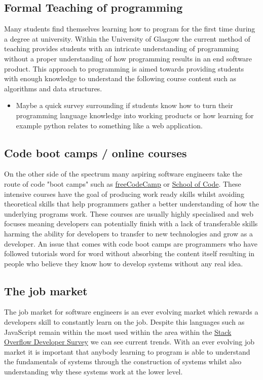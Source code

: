 \documentclass{l4proj}
\begin{document}
\subsection{Formal Teaching of programming}
Many students find themselves learning how to program for the first time during a degree at university. Within the University of Glasgow the current method of teaching provides students with an intricate understanding of programming without a proper understanding of how programming results in an end software product. This approach to programming is aimed towards providing students with enough knowledge to understand the following course content such as algorithms and data structures.
\begin{itemize}
    \item Maybe a quick survey surrounding if students know how to turn their programming language knowledge into working products or how learning for example python relates to something like a web application.
\end{itemize}


\subsection{Code boot camps / online courses}
On the other side of the spectrum many aspiring software engineers take the route of code "boot camps" such as \href{https://www.freecodecamp.org/}{freeCodeCamp} or \href{https://www.schoolofcode.co.uk/}{School of Code}. These intensive courses have the goal of producing work ready skills whilst avoiding theoretical skills that help programmers gather a better understanding of how the underlying programs work. These courses are usually highly specialised and web focuses meaning developers can potentially finish with a lack of transferable skills harming the ability for developers to transfer to new technologies and grow as a developer. An issue that comes with code boot camps are programmers who have followed tutorials word for word without absorbing the content itself resulting in people who believe they know how to develop systems without any real idea.

\subsection{The job market}
The job market for software engineers is an ever evolving market which rewards a developers skill to constantly learn on the job. Despite this languages such as JavaScript remain within the most used within the area within the \href{https://survey.stackoverflow.co/2022/#technology-most-popular-technologies}{Stack Overflow Developer Survey} we can see current trends. With an ever evolving job market it is important that anybody learning to program is able to understand the fundamentals of systems through the construction of systems whilst also understanding why these systems work at the lower level.
\end{document}
